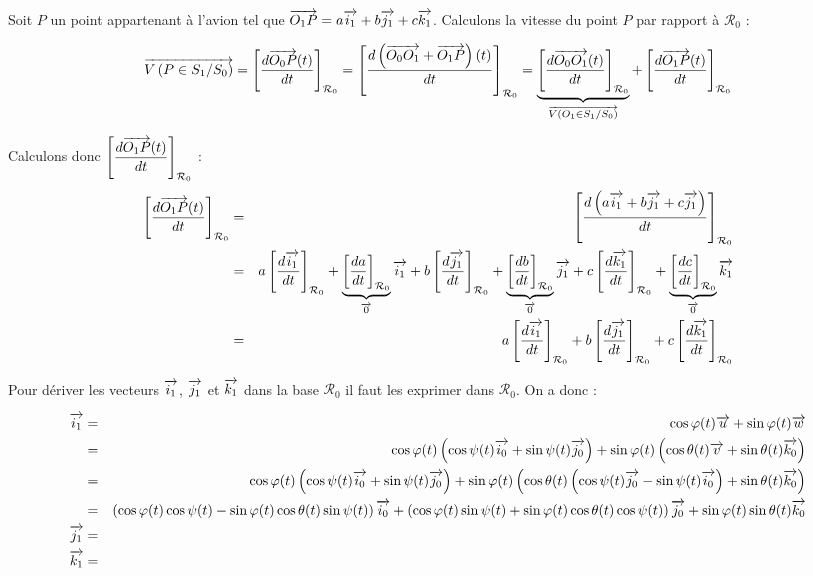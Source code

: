 \documentclass[10pt,oneside]{article}
\begin{document}
Soit $P$ un point appartenant à l'avion tel que $\overrightarrow{O_1P}=a\overrightarrow{i_1}+b\overrightarrow{j_1}+c\overrightarrow{k_1}$. Calculons la vitesse du point $P$ par rapport à $\mathcal{R}_0$ :

$$
\overrightarrow{V\left( {P} \in {S_1}/{S_0}\right)}=\left[\dfrac{d\overrightarrow{O_0 P}(t)}{dt}\right]_{\mathcal{R}_0}
= \left[\dfrac{d\left( \overrightarrow{O_0 O_1} + \overrightarrow{O_1P}\right)(t)}{dt}\right]_{\mathcal{R}_0}
=\underbrace{\left[\dfrac{d\overrightarrow{O_0 O_1}(t)}{dt}\right]_{\mathcal{R}_0}}_{\overrightarrow{V\left( {O_1} \in {S_1}/{S_0}\right)}}
+\left[\dfrac{d\overrightarrow{O_1 P}(t)}{dt}\right]_{\mathcal{R}_0}
$$

Calculons donc $\left[\dfrac{d\overrightarrow{O_1 P}(t)}{dt}\right]_{\mathcal{R}_0}$ :
\begin{eqnarray*}
\left[\dfrac{d\overrightarrow{O_1 P}(t)}{dt}\right]_{\mathcal{R}_0} & = & 
\left[\dfrac{d\left(a\overrightarrow{i_1}+b\overrightarrow{j_1}+c\overrightarrow{j_1} \right)}{dt}\right]_{\mathcal{R}_0} \\
& = & a\left[\dfrac{d\overrightarrow{i_1}}{dt}\right]_{\mathcal{R}_0}
+ \underbrace{\left[\dfrac{da}{dt}\right]_{\mathcal{R}_0}}_{\overrightarrow{0}} \overrightarrow{i_1}
+b\left[\dfrac{d\overrightarrow{j_1}}{dt}\right]_{\mathcal{R}_0}
+ \underbrace{\left[\dfrac{db}{dt}\right]_{\mathcal{R}_0}}_{\overrightarrow{0}} \overrightarrow{j_1}
+c\left[\dfrac{d\overrightarrow{k_1}}{dt}\right]_{\mathcal{R}_0} 
+ \underbrace{\left[\dfrac{dc}{dt}\right]_{\mathcal{R}_0}}_{\overrightarrow{0}} \overrightarrow{k_1} \\
& = & a\left[\dfrac{d\overrightarrow{i_1}}{dt}\right]_{\mathcal{R}_0}
+b\left[\dfrac{d\overrightarrow{j_1}}{dt}\right]_{\mathcal{R}_0}
+c\left[\dfrac{d\overrightarrow{k_1}}{dt}\right]_{\mathcal{R}_0} \\
\end{eqnarray*}

Pour dériver les vecteurs $\overrightarrow{i_1}$, $\overrightarrow{j_1}$ et $\overrightarrow{k_1}$ dans la base $\mathcal{R}_0$ il faut les exprimer dans $\mathcal{R}_0$. On a donc :

\begin{eqnarray*}
\overrightarrow{i_1} & = &  \cos\varphi(t) \overrightarrow{u} +  \sin\varphi(t) \overrightarrow{w}  \\
 & = & \cos\varphi(t)\left(\cos \psi(t) \overrightarrow{i_0}+\sin \psi(t) \overrightarrow{j_0} \right)+  \sin\varphi(t) \left( \cos \theta(t) \overrightarrow{v}+\sin \theta(t) \overrightarrow{k_0} \right) \\
 & = & \cos\varphi(t)\left(\cos \psi(t) \overrightarrow{i_0}+\sin \psi(t) \overrightarrow{j_0} \right)+  \sin\varphi(t) \left( \cos \theta(t) \left(\cos \psi(t) \overrightarrow{j_0}-\sin \psi(t) \overrightarrow{i_0}  \right)+\sin \theta(t) \overrightarrow{k_0} \right) \\
& = & \left(\cos\varphi(t)\cos \psi(t) - \sin\varphi(t) \cos \theta(t)\sin \psi(t) \right)\overrightarrow{i_0}  + \left(\cos\varphi(t) \sin \psi(t) + \sin\varphi(t) \cos \theta(t) \cos \psi(t) \right)\overrightarrow{j_0} + \sin\varphi(t) \sin \theta(t) \overrightarrow{k_0}\\
\overrightarrow{j_1} & = & \\
\overrightarrow{k_1} & = & \\
\end{eqnarray*}
\end{document}
